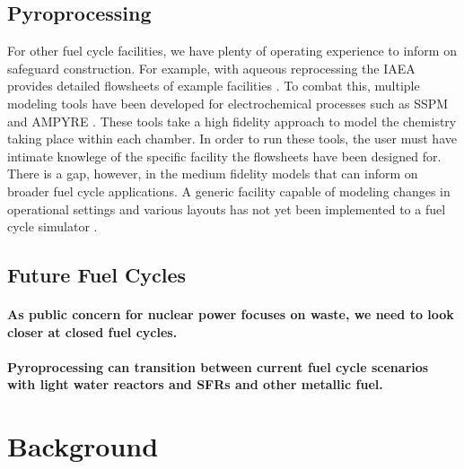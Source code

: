 \subsection{Pyroprocessing}
For other fuel cycle facilities, we have plenty of operating experience to inform on safeguard construction. For example, with aqueous reprocessing
the IAEA provides detailed flowsheets of example facilities \cite{international_atomic_energy_agency_implications_2004}. To combat this, multiple modeling
tools have been developed for electrochemical processes such as SSPM and AMPYRE \cite{}. These tools take a high fidelity approach to model the
chemistry taking place within each chamber. In order to run these tools, the user must have intimate knowlege of the specific facility the flowsheets have
been designed for. There is a gap, however, in the medium fidelity models that can inform on broader fuel cycle applications. A generic facility
capable of modeling changes in operational settings and various layouts has not yet been implemented to a fuel cycle simulator \cite{borrelli_approaches_2017}.


\subsection{Future Fuel Cycles}

\paragraph{As public concern for nuclear power focuses on waste, we need to look closer at closed fuel cycles.}

\paragraph{Pyroprocessing can transition between current fuel cycle scenarios with light water reactors and SFRs and other metallic fuel.}


\section{Background}
